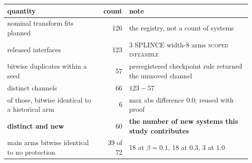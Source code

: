\begin{tabular}{@{}p{5.2cm} r p{6.4cm}@{}}
\toprule
quantity & count & note \\
\midrule
nominal transform fits planned & 126 & the registry, not a count of systems \\
released interfaces & 123 & 3 SPLINCE width-8 arms \textsc{scoped infeasible} \\
bitwise duplicates within a seed & 57 & preregistered checkpoint rule returned the unmoved channel \\
distinct channels & 66 & $123-57$ \\
of those, bitwise identical to a historical arm & 6 & max abs difference $0.0$; reused with proof \\
\textbf{distinct and new} & 60 & \textbf{the number of new systems this study contributes} \\
\midrule
main arms bitwise identical to no protection & 39 of 72 & 18 at $\beta=0.1$, 18 at $0.3$, 3 at $1.0$ \\
\bottomrule
\end{tabular}
